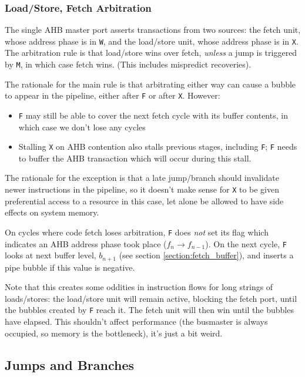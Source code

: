 \documentclass{article}
\begin{document}
\subsubsection{Load/Store, Fetch Arbitration}

The single AHB master port asserts transactions from two sources: the fetch unit, whose address phase is in \texttt{W}, and the load/store unit, whose address phase is in \texttt{X}. The arbitration rule is that load/store wins over fetch, \textit{unless} a jump is triggered by \texttt{M}, in which case fetch wins. (This includes mispredict recoveries).

The rationale for the main rule is that arbitrating either way can cause a bubble to appear in the pipeline, either after \texttt{F} or after \texttt{X}. However:

\begin{itemize}
	\item \texttt{F} may still be able to cover the next fetch cycle with its buffer contents, in which case we don't lose any cycles
	\item Stalling \texttt{X} on AHB contention also stalls previous stages, including \texttt{F}; \texttt{F} needs to buffer the AHB transaction which will occur during this stall.
\end{itemize}

The rationale for the exception is that a late jump/branch should invalidate newer instructions in the pipeline, so it doesn't make sense for \texttt{X} to be given preferential access to a resource in this case, let alone be allowed to have side effects on system memory.

On cycles where code fetch loses arbitration, \texttt{F} does \textit{not} set its flag which indicates an AHB address phase took place ($f_n \to f_{n-1}$). On the next cycle, \texttt{F} looks at next buffer level, $b_{n+1}$ (see section \ref{section:fetch_buffer}), and inserts a pipe bubble if this value is negative.

Note that this creates some oddities in instruction flows for long strings of loads/stores: the load/store unit will remain active, blocking the fetch port, until the bubbles created by \texttt{F} reach it. The fetch unit will then win until the bubbles have elapsed. This shouldn't affect performance (the busmaster is always occupied, so memory is the bottleneck), it's just a bit weird.


\subsection{Jumps and Branches}
\end{document}
